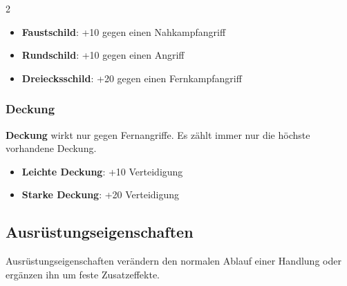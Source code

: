 \begin{multicols*}{2}
\begin{itemize}[leftmargin=*]
\item \textbf{Faustschild}: +10 gegen einen Nahkampfangriff
\item \textbf{Rundschild}: +10 gegen einen Angriff
\item \textbf{Dreiecksschild}: +20 gegen einen Fernkampfangriff
\end{itemize}

\subsubsection{Deckung}\label{sec:deckung}

\textbf{Deckung} wirkt nur gegen Fernangriffe.
Es zählt immer nur die höchste vorhandene Deckung.

\begin{itemize}[leftmargin=*]
\item \textbf{Leichte Deckung}: +10 Verteidigung
\item \textbf{Starke Deckung}: +20 Verteidigung
\end{itemize}

\subsection{Ausrüstungseigenschaften}\label{sec:eigenschaften}

Ausrüstungseigenschaften verändern den normalen Ablauf einer Handlung oder ergänzen ihn um feste Zusatzeffekte.


\end{multicols*}
